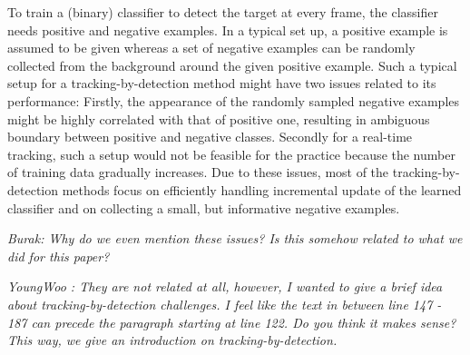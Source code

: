 \documentclass[10pt,twocolumn,letterpaper]{article}
\newcounter{ct}
\begin{document}
To train a (binary) classifier to detect the target at every frame,
the classifier needs positive and negative examples. In a typical set
up, a positive example is assumed to be given whereas a set of
negative examples can be randomly collected from the background around
the given positive example. Such a typical setup for a
tracking-by-detection method might have two issues related to its
performance: Firstly, the appearance of the randomly sampled negative
examples might be highly correlated with that of positive one,
resulting in ambiguous boundary between positive and negative
classes. Secondly for a real-time tracking, such a setup would not be
feasible for the practice because the number of training data
gradually increases. Due to these issues, most of the
tracking-by-detection methods focus on efficiently handling
incremental update of the learned classifier and on collecting a
small, but informative negative examples.

{\it Burak: Why do we even mention these issues? Is this somehow
  related to what we did for this paper?}
  
{\it YoungWoo : They are not related at all, however, I wanted to give a brief idea about tracking-by-detection challenges. I feel like the text in between line 147 - 187 can precede the paragraph starting at line 122. Do you think it makes sense? This way, we give an introduction on tracking-by-detection.}

\end{document}
